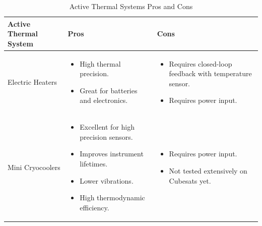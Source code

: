 \begin{table}[H]
\centering
\begin{tabular}{|p{}|p{}|p{}|} 
\hline
\textbf{Active Thermal System} & \textbf{Pros} & \textbf{Cons}
\\
\hline
     Electric Heaters
     &
    \begin{itemize}
        \item High thermal precision.
        \item Great for batteries and electronics.
    \end{itemize}
    &
    \begin{itemize}
        \item Requires closed-loop feedback with temperature sensor.
        \item Requires power input.
    \end{itemize}
    \\
\hline
     Mini Cryocoolers
     &
    \begin{itemize}
        \item Excellent for high precision sensors.
        \item Improves instrument lifetimes.
        \item Lower vibrations.
        \item High thermodynamic efficiency.
    \end{itemize}
    &
        \begin{itemize}
        \item Requires power input.
        \item Not tested extensively on Cubesats yet.
    \end{itemize}
    \\
\hline
\end{tabular}
\caption{Active Thermal Systems Pros and Cons}
\label{tbl:Active_Thermal_ProCon}
\end{table}
